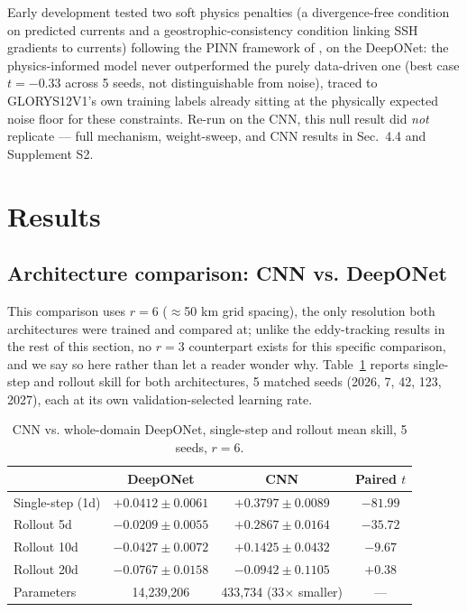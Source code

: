 \documentclass[11pt]{article}
\begin{document}
Early development tested two soft physics penalties (a divergence-free condition on predicted currents and a geostrophic-consistency condition linking SSH gradients to currents) following the PINN framework of \citet{Raissi2019}, on the DeepONet: the physics-informed model never outperformed the purely data-driven one (best case $t=-0.33$ across 5 seeds, not distinguishable from noise), traced to GLORYS12V1's own training labels already sitting at the physically expected noise floor for these constraints. Re-run on the CNN, this null result did \textit{not} replicate --- full mechanism, weight-sweep, and CNN results in Sec.~4.4 and Supplement S2.

\section{Results}

\subsection{Architecture comparison: CNN vs. DeepONet}

This comparison uses $r=6$ ($\approx$50 km grid spacing), the only resolution both architectures were trained and compared at; unlike the eddy-tracking results in the rest of this section, no $r=3$ counterpart exists for this specific comparison, and we say so here rather than let a reader wonder why. Table~\ref{tab:cnn_vs_deeponet} reports single-step and rollout skill for both architectures, 5 matched seeds (2026, 7, 42, 123, 2027), each at its own validation-selected learning rate.

\begin{table}[h]
\centering
\caption{CNN vs. whole-domain DeepONet, single-step and rollout mean skill, 5 seeds, $r=6$.}
\label{tab:cnn_vs_deeponet}
\begin{tabular}{lccc}
\toprule
 & DeepONet & CNN & Paired $t$ \\
\midrule
Single-step (1d) & $+0.0412 \pm 0.0061$ & $\mathbf{+0.3797 \pm 0.0089}$ & $-81.99$ \\
Rollout 5d & $-0.0209 \pm 0.0055$ & $+0.2867 \pm 0.0164$ & $-35.72$ \\
Rollout 10d & $-0.0427 \pm 0.0072$ & $+0.1425 \pm 0.0432$ & $-9.67$ \\
Rollout 20d & $-0.0767 \pm 0.0158$ & $-0.0942 \pm 0.1105$ & $+0.38$ \\
Parameters & 14,239,206 & 433,734 (33$\times$ smaller) & --- \\
\bottomrule
\end{tabular}
\end{table}
\end{document}
